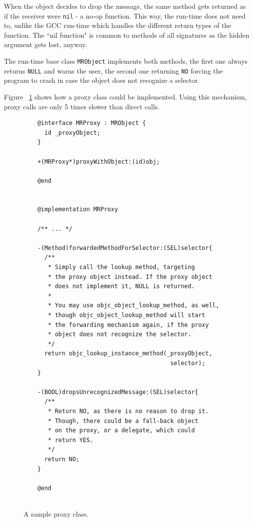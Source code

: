 When the object decides to drop the message, the same method gets returned as if the receiver were \verb=nil= - a no-op function. This way, the run-time does not need to, unlike the GCC run-time which handles the different return types of the function. The ``nil function" is common to methods of all signatures as the hidden argument gets lost, anyway.

The run-time base class \verb=MRObject= implements both methods, the first one always returns \verb=NULL= and warns the user, the second one returning \verb=NO= forcing the program to crash in case the object does not recognize a selector.

Figure ~\ref{fig:forwarding_proxy_class} shows how a proxy class could be implemented. Using this mechanism, proxy calls are only 5 times slower than direct calls.

\begin{figure}[H] 
  \begin{verbatim}
    @interface MRProxy : MRObject {
      id _proxyObject;
    }
    
    +(MRProxy*)proxyWithObject:(id)obj;
    
    @end
    
    
    @implementation MRProxy
    
    /** ... */
    
    -(Method)forwardedMethodForSelector:(SEL)selector{
      /** 
       * Simply call the lookup method, targeting
       * the proxy object instead. If the proxy object
       * does not implement it, NULL is returned.
       *
       * You may use objc_object_lookup_method, as well,
       * though objc_object_lookup_method will start
       * the forwarding mechanism again, if the proxy
       * object does not recognize the selector.
       */
      return objc_lookup_instance_method(_proxyObject, 
                                          selector);
    }
    
    -(BOOL)dropsUnrecognizedMessage:(SEL)selector{
      /** 
       * Return NO, as there is no reason to drop it.
       * Though, there could be a fall-back object 
       * on the proxy, or a delegate, which could 
       * return YES.
       */
      return NO;
    }
    
    @end
    
  \end{verbatim}
  \centering{}
  \caption{A sample proxy class.}
  \label{fig:forwarding_proxy_class}
\end{figure}

